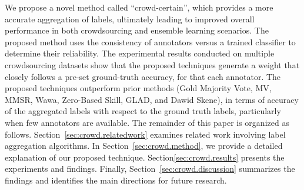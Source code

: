 We propose a novel method called ``crowd-certain'', which provides a more accurate aggregation of labels, ultimately leading to improved overall performance in both crowdsourcing and ensemble learning scenarios. The proposed method uses the consistency of annotators versus a trained classifier to determine their reliability. The experimental results conducted on multiple crowdsourcing datasets show that the proposed techniques generate a weight that closely follows a pre-set ground-truth accuracy, for that each annotator. The proposed techniques outperform prior methods  (Gold Majority Vote, MV, MMSR, Wawa, Zero-Based Skill, GLAD, and Dawid Skene), in terms of accuracy of the aggregated labels with respect to the ground truth labels, particularly when few annotators are available.
The remainder of this paper is organized as follows. Section~\ref{sec:crowd.relatedwork} examines related work involving label aggregation algorithms. In Section~\ref{sec:crowd.method}, we provide a detailed explanation of our proposed technique. Section\ref{sec:crowd.results} presents the experiments and findings. Finally, Section~\ref{sec:crowd.discussion} summarizes the findings and identifies the main directions for future research.


